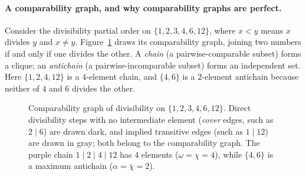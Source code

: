 \paragraph{A comparability graph, and why comparability graphs are perfect.}
Consider the divisibility partial order on $\{1,2,3,4,6,12\}$, where $x<y$ means $x$ divides $y$ and $x\neq y$. Figure~\ref{ch30:fig-divisibility} draws its comparability graph, joining two numbers if and only if one divides the other. A \emph{chain} (a pairwise-comparable subset) forms a clique; an \emph{antichain} (a pairwise-incomparable subset) forms an independent set. Here $\{1,2,4,12\}$ is a $4$-element chain, and $\{4,6\}$ is a $2$-element antichain because neither of $4$ and $6$ divides the other.

\begin{figure}[htbp]
\centering
{}
\caption{Comparability graph of divisibility on $\{1,2,3,4,6,12\}$. Direct divisibility steps with no intermediate element (\emph{cover} edges, such as $2\mid 6$) are drawn dark, and implied transitive edges (such as $1\mid 12$) are drawn in gray; both belong to the comparability graph. The purple chain $1\mid 2\mid 4\mid 12$ has $4$ elements ($\omega=\chi=4$), while $\{4,6\}$ is a maximum antichain ($\alpha=\bar\chi=2$).}
\label{ch30:fig-divisibility}
\end{figure}

